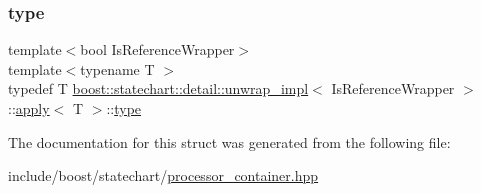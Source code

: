 \subsubsection{\texorpdfstring{type}{type}}
{\footnotesize\ttfamily template$<$bool Is\+Reference\+Wrapper$>$ \\
template$<$typename T $>$ \\
typedef T \mbox{\hyperlink{structboost_1_1statechart_1_1detail_1_1unwrap__impl}{boost\+::statechart\+::detail\+::unwrap\+\_\+impl}}$<$ Is\+Reference\+Wrapper $>$\+::\mbox{\hyperlink{structboost_1_1statechart_1_1detail_1_1unwrap__impl_1_1apply}{apply}}$<$ T $>$\+::\mbox{\hyperlink{structboost_1_1statechart_1_1detail_1_1unwrap__impl_1_1apply_a876d02ff6c624d7c2cb5ed523eca7eef}{type}}}



The documentation for this struct was generated from the following file\+:\begin{DoxyCompactItemize}
\item 
include/boost/statechart/\mbox{\hyperlink{processor__container_8hpp}{processor\+\_\+container.\+hpp}}\end{DoxyCompactItemize}
